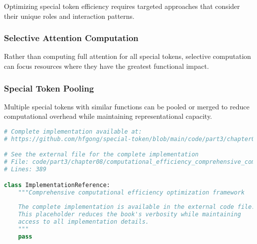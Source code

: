 Optimizing special token efficiency requires targeted approaches that consider their unique roles and interaction patterns.

\subsubsection{Selective Attention Computation}

Rather than computing full attention for all special tokens, selective computation can focus resources where they have the greatest functional impact.

\subsubsection{Special Token Pooling}

Multiple special tokens with similar functions can be pooled or merged to reduce computational overhead while maintaining representational capacity.

\begin{lstlisting}[language=Python, caption={Comprehensive computational efficiency optimization framework}]
# Complete implementation available at:
# https://github.com/hfgong/special-token/blob/main/code/part3/chapter08/computational_efficiency_comprehensive_computational_ef.py

# See the external file for the complete implementation
# File: code/part3/chapter08/computational_efficiency_comprehensive_computational_ef.py
# Lines: 389

class ImplementationReference:
    """Comprehensive computational efficiency optimization framework
    
    The complete implementation is available in the external code file.
    This placeholder reduces the book's verbosity while maintaining
    access to all implementation details.
    """
    pass
\end{lstlisting}